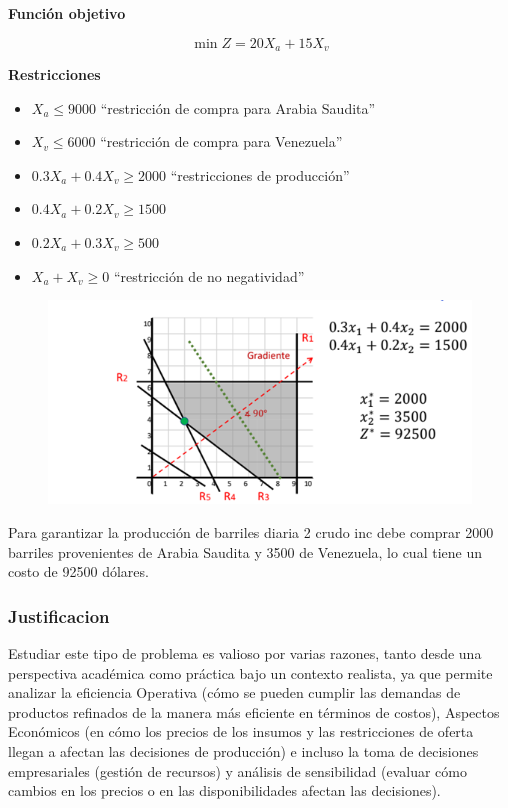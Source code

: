 \documentclass[conference]{IEEEtran}
\begin{document}
\textbf{Función objetivo}

\begin{equation*}
    \min Z = 20X_{a} + 15X_{v}
\end{equation*}

\textbf{Restricciones}

\begin{itemize}
    \item $X_{a} \leq 9000$ ``restricción de compra para Arabia Saudita''
    \item $X_{v} \leq 6000$ ``restricción de compra para Venezuela''
    \item $0.3X_{a} + 0.4X_{v} \geq 2000$ ``restricciones de producción''
    \item $0.4X_{a} + 0.2X_{v} \geq 1500$
    \item $0.2X_{a} + 0.3X_{v} \geq 500$
    \item $X_{a} + X_{v} \geq 0$ ``restricción de no negatividad''
\end{itemize}

\begin{figure}[H]
    \begin{center}
        \includegraphics[width=\linewidth]{./Images/Caso-1_ImagenSolucion.png}
        \caption{}
    \end{center}
\end{figure}

Para garantizar la producción de barriles diaria 2 crudo inc debe comprar
2000 barriles provenientes de Arabia Saudita y 3500 de Venezuela, lo cual
tiene un costo de 92500 dólares.

\subsubsection{Justificacion}

Estudiar este tipo de problema es valioso por varias razones, tanto desde
una perspectiva académica como práctica bajo un contexto realista, ya que
permite analizar la eficiencia Operativa (cómo se pueden cumplir las
demandas de productos refinados de la manera más eficiente en términos
de costos), Aspectos Económicos (en cómo los precios de los insumos y
las restricciones de oferta llegan a afectan las decisiones de producción) e
incluso la toma de decisiones empresariales (gestión de recursos) y
análisis de sensibilidad (evaluar cómo cambios en los precios o en las
disponibilidades afectan las decisiones).
\end{document}
